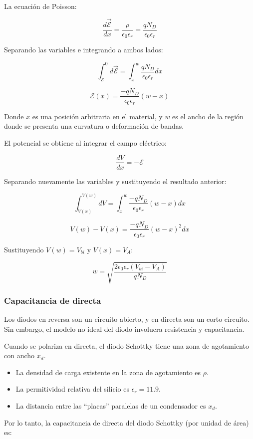 La ecuación de Poisson:

\[ \dfrac{d\vec{\mathcal{E}}}{dx} = \dfrac{\rho}{\epsilon_0 \epsilon_r} = \dfrac{q N_D}{\epsilon_0 \epsilon_r} \]

Separando las variables e integrando a ambos lados:

\[ \int_{\mathcal{E}}^{0} d\vec{\mathcal{E}} = \int_x^w \dfrac{q N_D}{\epsilon_0 \epsilon_r} dx \]

\[ \mathcal{E}(x) = \dfrac{-q N_D}{\epsilon_0 \epsilon_r} (w - x) \]

Donde $x$ es una posición arbitraria en el material, y $w$ es el ancho de la región donde se presenta una curvatura o deformación de bandas.

El potencial se obtiene al integrar el campo eléctrico:

\[ \dfrac{dV}{dx} = -\mathcal{E} \]

Separando nuevamente las variables y sustituyendo el resultado anterior:

\[ \int_{V(x)}^{V(w)}  dV = \int_x^w \dfrac{-q N_D}{\epsilon_0 \epsilon_r} (w - x) dx \]

\[ V(w) - V(x) =\dfrac{-q N_D}{\epsilon_0 \epsilon_r} (w - x)^2 dx \]

Sustituyendo $V(w) = V_{bi}$ y $V(x) = V_A$:

\[ w = \sqrt{\dfrac{2 \epsilon_0 \epsilon_r (V_{bi} - V_A)}{q N_D}} \]


\subsubsection{Capacitancia de directa}

Los diodos en reversa son un circuito abierto, y en directa son un corto circuito. Sin embargo, el modelo no ideal del diodo involucra resistencia y capacitancia.

Cuando se polariza en directa, el diodo Schottky tiene una zona de agotamiento con ancho $x_d$.

\begin{itemize}
    \item La densidad de carga existente en la zona de agotamiento es $\rho$.
    \item La permitividad relativa del silicio es $\epsilon_r = 11.9$.
    \item La distancia entre las ``placas'' paralelas de un condensador es $x_d$.
\end{itemize}

Por lo tanto, la capacitancia de directa del diodo Schottky (por unidad de área) es:

